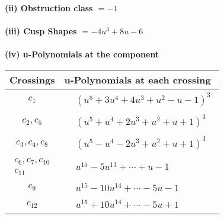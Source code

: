 \documentclass[1p]{elsarticle_modified}
\theoremstyle{definition}
\begin{document}
\flushleft \textbf{(ii) Obstruction class $= -1$}\\~\\
\flushleft \textbf{(iii) Cusp Shapes $= -4 u^3+8 u-6$}\\~\\
\newpage\renewcommand{\arraystretch}{1}
\flushleft \textbf{(iv) u-Polynomials at the component}\newline \\
\begin{tabular}{m{50pt}|m{274pt}}
Crossings & \hspace{64pt}u-Polynomials at each crossing \\
\hline $$\begin{aligned}c_{1}\end{aligned}$$&$\begin{aligned}
&(u^5+3 u^4+4 u^3+u^2- u-1)^3
\end{aligned}$\\
\hline $$\begin{aligned}c_{2},c_{5}\end{aligned}$$&$\begin{aligned}
&(u^5+u^4+2 u^3+u^2+u+1)^3
\end{aligned}$\\
\hline $$\begin{aligned}c_{3},c_{4},c_{8}\end{aligned}$$&$\begin{aligned}
&(u^5- u^4-2 u^3+u^2+u+1)^3
\end{aligned}$\\
\hline $$\begin{aligned}c_{6},c_{7},c_{10}\\c_{11}\end{aligned}$$&$\begin{aligned}
&u^{15}-5 u^{13}+\cdots+u-1
\end{aligned}$\\
\hline $$\begin{aligned}c_{9}\end{aligned}$$&$\begin{aligned}
&u^{15}-10 u^{14}+\cdots-5 u-1
\end{aligned}$\\
\hline $$\begin{aligned}c_{12}\end{aligned}$$&$\begin{aligned}
&u^{15}+10 u^{14}+\cdots-5 u+1
\end{aligned}$\\
\hline
\end{tabular}\\~\\
\end{document}

